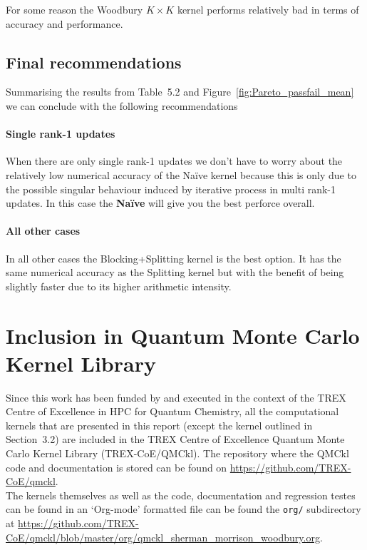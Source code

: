 \documentclass[11pt]{article}
\numberwithin{figure}{section}
\numberwithin{table}{section}
\begin{document}
    For some reason the Woodbury $K\times K$ kernel performs relatively bad in terms of accuracy and performance.
    
    \subsection{Final recommendations}
      Summarising the results from Table~5.2 and Figure~\ref{fig:Pareto_passfail_mean} we can conclude with the following recommendations
      
    \paragraph{Single rank-1 updates} When there are only single rank-1 updates we don't have to worry about the relatively low numerical accuracy of the Na\"{i}ve kernel because this is only due to the possible singular behaviour induced by iterative process in multi rank-1 updates. In this case the \textbf{Na\"{i}ve} will give you the best perforce overall.
    
    \paragraph{All other cases} In all other cases the Blocking+Splitting kernel is the best option. It has the same numerical accuracy as the Splitting kernel but with the benefit of being slightly faster due to its higher arithmetic intensity. 

  \section{Inclusion in Quantum Monte Carlo Kernel Library}
    Since this work has been funded by and executed in the context of the TREX Centre of Excellence in HPC for Quantum Chemistry\cite{trex-coe}, all the computational kernels that are presented in this report (except the kernel outlined in Section~3.2) are included in the TREX Centre of Excellence Quantum Monte Carlo Kernel Library\cite{qmckl} (TREX-CoE/QMCkl). The repository where the QMCkl code and documentation is stored can be found on \url{https://github.com/TREX-CoE/qmckl}.\\
    
    The kernels themselves as well as the code, documentation and regression testes can be found in an `Org-mode' formatted file can be found the \texttt{org/} subdirectory at \url{https://github.com/TREX-CoE/qmckl/blob/master/org/qmckl_sherman_morrison_woodbury.org}.\\
    
\end{document}
